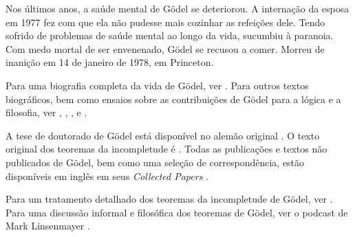 \documentclass[../../../include/open-logic-section]{subfiles}
\begin{document}
Nos últimos anos, a saúde mental de G{\"o}del se deteriorou. A
internação da esposa em 1977 fez com que ela não pudesse mais cozinhar
as refeições dele. Tendo sofrido de problemas de saúde mental ao longo da
vida, sucumbiu à paranoia. Com medo mortal de ser envenenado,
G{\"o}del se recusou a comer. Morreu de inanição em 14 de janeiro de
1978, em Princeton.

\begin{reading}
Para uma biografia completa da vida de G{\"o}del, ver
\citet{Dawson1997}. Para outros textos biográficos, bem como ensaios
sobre as contribuições de G{\"o}del para a lógica e a filosofia, ver
\citet{Wang1990}, \citet{Baaz2011}, \citet{Takeuti2003}, e
\citet{Sigmund2007}.

A tese de doutorado de G{\"o}del está disponível no alemão
original \citep{Godel1929}.  O texto original dos teoremas da
incompletude é \citep{Godel1931}. Todas as publicações e textos não
publicados de G\"odel, bem como uma seleção de correspondência, estão
disponíveis em inglês em seus \emph{Collected Papers}
\citet{Godel1986,Godel1990}.

Para um tratamento detalhado dos teoremas da incompletude de
G{\"o}del, ver \citet{Smith2013}. Para uma discussão informal e
filosófica dos teoremas de G{\"o}del, ver o podcast de Mark
Linsenmayer \citep{Linsenmayer2014}.
\end{reading}
\end{document}
